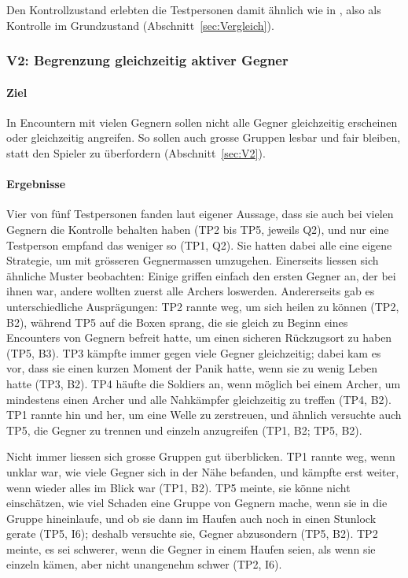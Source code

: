 \documentclass[../Main.tex]{subfiles}
\begin{document}
Den Kontrollzustand erlebten die Testpersonen damit ähnlich wie in , also als Kontrolle im Grundzustand (Abschnitt~\ref{sec:Vergleich}).

\subsubsection{V2: Begrenzung gleichzeitig aktiver Gegner}

\paragraph{Ziel}
In Encountern mit vielen Gegnern sollen nicht alle Gegner gleichzeitig erscheinen oder gleichzeitig angreifen. So sollen auch grosse Gruppen lesbar und fair bleiben, statt den Spieler zu überfordern (Abschnitt~\ref{sec:V2}).

\paragraph{Ergebnisse}
Vier von fünf Testpersonen fanden laut eigener Aussage, dass sie auch bei vielen Gegnern die Kontrolle behalten haben (TP2 bis TP5, jeweils Q2), und nur eine Testperson empfand das weniger so (TP1, Q2). Sie hatten dabei alle eine eigene Strategie, um mit grösseren Gegnermassen umzugehen. Einerseits liessen sich ähnliche Muster beobachten: Einige griffen einfach den ersten Gegner an, der bei ihnen war, andere wollten zuerst alle Archers loswerden. Andererseits gab es unterschiedliche Ausprägungen: TP2 rannte weg, um sich heilen zu können (TP2, B2), während TP5 auf die Boxen sprang, die sie gleich zu Beginn eines Encounters von Gegnern befreit hatte, um einen sicheren Rückzugsort zu haben (TP5, B3). TP3 kämpfte immer gegen viele Gegner gleichzeitig; dabei kam es vor, dass sie einen kurzen Moment der Panik hatte, wenn sie zu wenig Leben hatte (TP3, B2). TP4 häufte die Soldiers an, wenn möglich bei einem Archer, um mindestens einen Archer und alle Nahkämpfer gleichzeitig zu treffen (TP4, B2). TP1 rannte hin und her, um eine Welle zu zerstreuen, und ähnlich versuchte auch TP5, die Gegner zu trennen und einzeln anzugreifen (TP1, B2; TP5, B2).

Nicht immer liessen sich grosse Gruppen gut überblicken. TP1 rannte weg, wenn unklar war, wie viele Gegner sich in der Nähe befanden, und kämpfte erst weiter, wenn wieder alles im Blick war (TP1, B2). TP5 meinte, sie könne nicht einschätzen, wie viel Schaden eine Gruppe von Gegnern mache, wenn sie in die Gruppe hineinlaufe, und ob sie dann im Haufen auch noch in einen Stunlock gerate (TP5, I6); deshalb versuchte sie, Gegner abzusondern (TP5, B2). TP2 meinte, es sei schwerer, wenn die Gegner in einem Haufen seien, als wenn sie einzeln kämen, aber nicht unangenehm schwer (TP2, I6).
\end{document}
